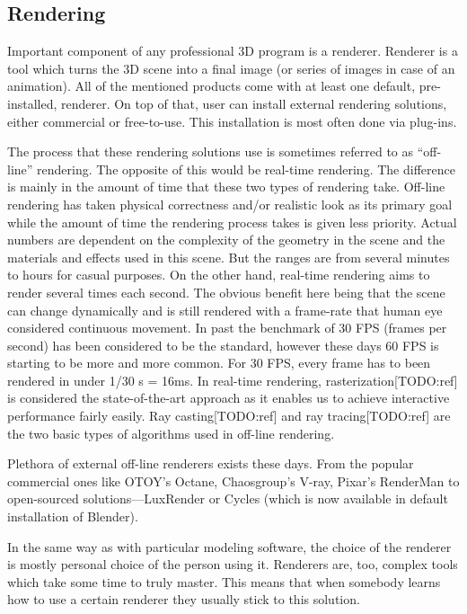 \documentclass[
  digital, %
  table,   %
  nolof,     %
  nolot,     %
]{fithesis3}
\begin{document}
\subsection{Rendering}
Important component of any professional 3D program is a renderer. Renderer is a tool which turns the 3D scene into a final image (or series of images in case of an animation). All of the mentioned products come with at least one default, pre-installed, renderer. On top of that, user can install external rendering solutions, either commercial or free-to-use. This installation is most often done via plug-ins.

The process that these rendering solutions use is sometimes referred to as ``off-line'' rendering. The opposite of this would be real-time rendering. The difference is mainly in the amount of time that these two types of rendering take. Off-line rendering has taken physical correctness and/or realistic look as its primary goal while the amount of  time the rendering process takes is given less priority. Actual numbers are dependent on the complexity of the geometry in the scene and the materials and effects used in this scene. But the ranges are from several minutes to hours for casual purposes. On the other hand, real-time rendering aims to render several times each second. The obvious benefit here being that the scene can change dynamically and is still rendered with a frame-rate that human eye considered continuous movement. In past the benchmark of 30 FPS (frames per second) has been considered to be the standard, however these days 60 FPS is starting to be more and more common. For 30 FPS, every frame has to been rendered in under 1/30 s = 16ms. In real-time rendering, rasterization[TODO:ref] is considered the state-of-the-art approach as it enables us to achieve interactive performance fairly easily.  Ray casting[TODO:ref] and ray tracing[TODO:ref] are the two basic types of algorithms used in off-line rendering.

Plethora of external off-line renderers exists these days. From the popular commercial ones like OTOY's Octane, Chaosgroup's V-ray, Pixar's RenderMan to open-sourced solutions—LuxRender or Cycles (which is now available in default installation of Blender).

In the same way as with particular modeling software, the choice of the renderer is mostly personal choice of the person using it. Renderers are, too, complex tools  which take some time to truly master. This means that when somebody learns how to use a certain renderer they usually stick to this solution.
\end{document}
